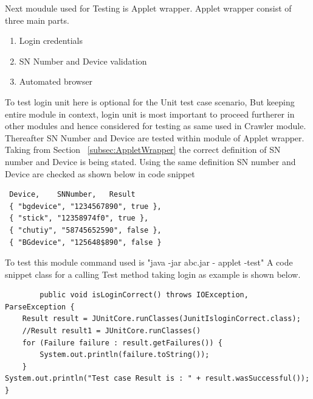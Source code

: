 \documentclass[article,type=msc,colorback,accentcolor=tud9c,twoside,11pt]{tudthesis}
\begin{document}
 
Next moudule used for Testing is Applet wrapper. Applet wrapper consist of three main parts.
 \begin{enumerate}
\item Login credentials
\item SN Number and Device validation
\item Automated browser
\end{enumerate}
To test login unit here is optional for the Unit test case scenario, But keeping entire module in context, login unit is most important to proceed furtherer in other modules and hence considered for testing as same used in Crawler module. Thereafter SN Number and Device are tested within module of Applet wrapper. Taking from Section
~\ref{subsec:AppletWrapper} the correct definition of SN number and Device is being stated. Using the same definition SN number and Device are checked as shown below in code snippet

\begin{lstlisting}
 Device, 	SNNumber, 	Result
 { "bgdevice", "1234567890", true },
 { "stick", "12358974f0", true },
 { "chutiy", "58745652590", false },
 { "BGdevice", "125648$890", false }
\end{lstlisting}   
To test this module command used is "java -jar abc.jar - applet -test" A code snippet class for a calling Test method taking login as example is shown below.
\begin{lstlisting}
		public void isLoginCorrect() throws IOException, ParseException {
	Result result = JUnitCore.runClasses(JunitIsloginCorrect.class);
	//Result result1 = JUnitCore.runClasses()
	for (Failure failure : result.getFailures()) {
		System.out.println(failure.toString());
	}
System.out.println("Test case Result is : " + result.wasSuccessful());
}
\end{lstlisting}

\cleardoublepage
\cleardoublepage


\end{document}
